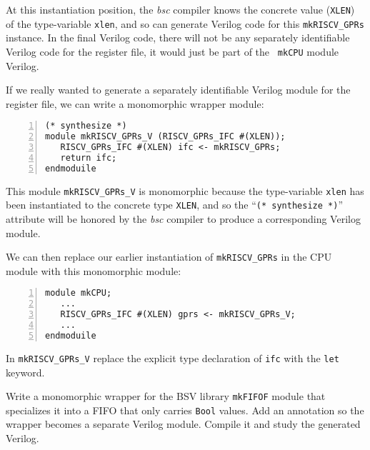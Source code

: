 At this instantiation position, the \emph{bsc} compiler knows the
concrete value ({\tt XLEN}) of the type-variable {\tt xlen}, and so
can generate Verilog code for this {\tt mkRISCV\_GPRs} instance.  In
the final Verilog code, there will not be any separately identifiable
Verilog code for the register file, it would just be part of the {\tt
mkCPU} module Verilog.

If we really wanted to generate a separately identifiable Verilog
module for the register file, we can write a monomorphic wrapper
module:

{\small
\begin{Verbatim}[frame=single, numbers=left]
(* synthesize *)
module mkRISCV_GPRs_V (RISCV_GPRs_IFC #(XLEN));
   RISCV_GPRs_IFC #(XLEN) ifc <- mkRISCV_GPRs;
   return ifc;
endmoduile
\end{Verbatim}
}

This module {\tt mkRISCV\_GPRs\_V} is monomorphic because the
type-variable {\tt xlen} has been instantiated to the concrete type
{\tt XLEN}, and so the ``{\tt (* synthesize *)}'' attribute will be
honored by the \emph{bsc} compiler to produce a corresponding Verilog
module.

We can then replace our earlier instantiation of {\tt mkRISCV\_GPRs}
in the CPU module with this monomorphic module:

{\small
\begin{Verbatim}[frame=single, numbers=left]
module mkCPU;
   ...
   RISCV_GPRs_IFC #(XLEN) gprs <- mkRISCV_GPRs_V;
   ...
endmoduile
\end{Verbatim}
}

\hdivider

\Exercise

\hm In {\tt mkRISCV\_GPRs\_V} replace the explicit type declaration
of {\tt ifc} with the {\tt let} keyword.

\Exercise

\hm Write a monomorphic wrapper for the BSV library {\tt mkFIFOF}
module that specializes it into a FIFO that only carries {\tt Bool}
values.  Add an annotation so the wrapper becomes a separate Verilog
module.  Compile it and study the generated Verilog.

\Endexercise

